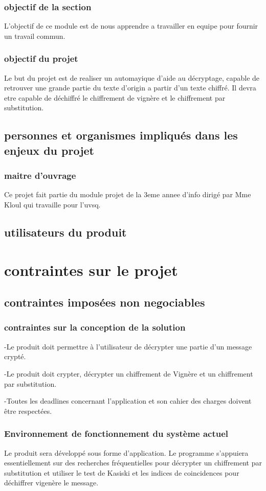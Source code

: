 \documentclass[a4]{article}
\begin{document}
			\subsubsection{objectif de la section}
				L'objectif de ce module est de nous apprendre a travailler en equipe pour fournir un travail commun.
			\subsubsection{objectif du projet}
				Le but du projet est de realiser un automayique d'aide au décryptage, capable de retrouver une grande partie du texte d'origin a partir d'un texte chiffré. Il devra etre capable de déchiffré le chiffrement de vignère et le chiffrement par substitution.
		\subsection{personnes et organismes impliqués dans les enjeux du projet} 
			\subsubsection{maitre d'ouvrage}
				Ce projet fait partie du module projet de la 3eme annee d'info dirigé par Mme Kloul qui travaille pour l'uvsq.			
		\subsection{utilisateurs du produit}
			
	\section{contraintes sur le projet}
		\subsection{contraintes imposées non negociables} 
			\subsubsection{contraintes sur la conception de la solution}
				-Le produit doit permettre à l'utilisateur de décrypter une partie d'un message crypté.

				-Le produit doit crypter, décrypter un chiffrement de Vignère et un chiffrement par substitution.

				-Toutes les deadlines concernant l'application et son cahier des charges doivent être respectées.
			\subsubsection{Environnement de fonctionnement du système actuel }
				Le produit sera développé sous forme d'application. 
				Le programme s'appuiera essentiellement sur des recherches fréquentielles pour décrypter un chiffrement par substitution et utiliser le test de Kasiski et les indices de coincidences pour déchiffrer vigenère le message.
\end{document}
